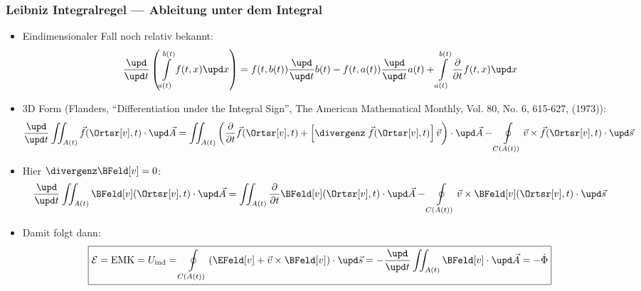 \begin{frame}
  \frametitle{Leibniz Integralregel --- Ableitung unter dem Integral}
  \begin{itemize}[<+->]
  \item Eindimensionaler Fall noch relativ bekannt:
    $$
    \frac{\upd}{\upd t} \left( \int\displaylimits_{a(t)}^{b(t)} f(t,x)\upd x \right) = f(t,b(t)) \frac{\upd }{\upd t}b(t)  - f(t,a(t)) \frac{\upd }{\upd t}a(t) +  \int\displaylimits_{a(t)}^{b(t)} \frac{\partial}{\partial t}f(t,x)\upd x 
    $$
  \item 3D Form (Flanders, \enquote{Differentiation under the Integral Sign}, The American Mathematical Monthly, Vol. 80, No. 6, 615-627, (1973)):
    $$
    \frac{\upd}{\upd t}  \iint_{A(t)} \vec{f} (\Ortsr[v], t) \cdot \upd\vec{A} = \iint_{A(t)} \left( \frac{\partial}{\partial t}\vec{f}(\Ortsr[v], t) + \left[ \divergenz\; \vec{f}(\Ortsr[v], t) \right] \vec{v} \right) \cdot \upd\vec{A} - \oint\displaylimits_{C(A(t))}
    \vec{v} \times  \vec{f}(\Ortsr[v], t) \cdot \upd\vec{s}   $$
  \item Hier \(\divergenz \BFeld[v]=0\):
    $$
    \frac{\upd}{\upd t}  \iint_{A(t)} \BFeld[v] (\Ortsr[v], t) \cdot \upd\vec{A} = \iint_{A(t)} \frac{\partial}{\partial t}\BFeld[v](\Ortsr[v], t) \cdot \upd\vec{A} - \oint\displaylimits_{C(A(t))}
    \vec{v} \times \BFeld[v](\Ortsr[v], t) \cdot \upd\vec{s}   $$
  \item Damit folgt dann:
    $$
   \boxed{\mathcal{E}=\text{EMK}=U_\text{ind} = \oint\displaylimits_{C(A(t))} \left( \EFeld[v] + \vec{v} \times \BFeld[v]\right) \cdot\upd\vec{s} = - \frac{\upd}{\upd t}  \iint_{A(t)} \BFeld[v] \cdot \upd\vec{A}  = -\dot{\Phi}}
    $$
\end{itemize}
\end{frame}


